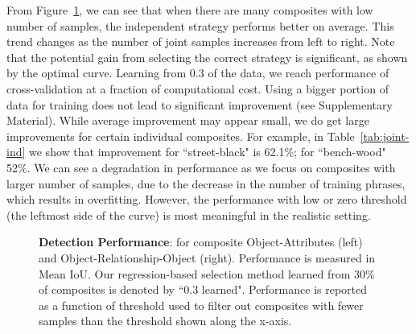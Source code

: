 \documentclass[runningheads]{llncs}
\begin{document}
From Figure~\ref{att_rel_perf_0.3}, we can see that when there are many composites with low number of samples, the independent strategy performs better on average. This trend changes as the number of joint samples increases from left to right. Note that the potential gain from selecting the correct strategy is significant, as shown by the optimal curve. Learning from $0.3$ of the data, we reach performance of cross-validation at a fraction of computational cost. Using a bigger portion of data for training does not lead to significant improvement (see %
Supplementary Material). While average improvement may appear small, we do get large improvements for certain individual composites. For example, in Table~\ref{tab:joint-ind} we show that improvement for ``street-black" is 62.1\%; for ``bench-wood" 52\%. 
We can see a degradation in performance as we focus on composites with larger number of samples, due to the decrease in the number of training phrases, which results in overfitting. However, the performance with low or zero threshold (the leftmost side of the curve) is most meaningful in the realistic setting. 


%
\begin{figure}[t]
    \centering
    \qquad
    \vspace{-0.05in}
    \caption{{\bf Detection Performance}: for composite Object-Attributes (left) and Object-Relationship-Object (right). Performance is measured in Mean IoU. Our regression-based selection method learned from 30\% of composites is denoted by ``0.3 learned". Performance is reported as a function of threshold used to filter out composites with fewer samples than the threshold shown along the x-axis.}%
    \label{att_rel_perf_0.3}
\vspace*{-0.7\baselineskip}  
\end{figure}
%
\end{document}
